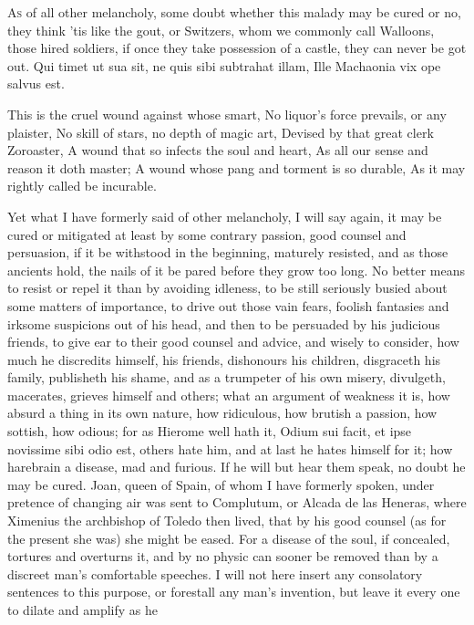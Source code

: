 {\lettrine{A}{s} of all other melancholy, some doubt whether this malady may be cured
or no, they think 'tis like the gout, or Switzers, whom we
commonly call Walloons, those hired soldiers, if once they take
possession of a castle, they can never be got out.
Qui timet ut sua sit, ne quis sibi subtrahat illam,
Ille Machaonia vix ope salvus est.

This is the cruel wound against whose smart,
No liquor's force prevails, or any plaister,
No skill of stars, no depth of magic art,
Devised by that great clerk Zoroaster,
A wound that so infects the soul and heart,
As all our sense and reason it doth master;
A wound whose pang and torment is so durable,
As it may rightly called be incurable.

Yet what I have formerly said of other melancholy, I will say again, it
may be cured or mitigated at least by some contrary passion, good
counsel and persuasion, if it be withstood in the beginning, maturely
resisted, and as those ancients hold, the nails of it be pared
before they grow too long. No better means to resist or repel it than
by avoiding idleness, to be still seriously busied about some matters
of importance, to drive out those vain fears, foolish fantasies and
irksome suspicions out of his head, and then to be persuaded by his
judicious friends, to give ear to their good counsel and advice, and
wisely to consider, how much he discredits himself, his friends,
dishonours his children, disgraceth his family, publisheth his shame,
and as a trumpeter of his own misery, divulgeth, macerates, grieves
himself and others; what an argument of weakness it is, how absurd a
thing in its own nature, how ridiculous, how brutish a passion, how
sottish, how odious; for as Hierome well hath it, Odium sui
facit, et ipse novissime sibi odio est, others hate him, and at last he
hates himself for it; how harebrain a disease, mad and furious. If he
will but hear them speak, no doubt he may be cured. Joan, queen
of Spain, of whom I have formerly spoken, under pretence of changing
air was sent to Complutum, or Alcada de las Heneras, where Ximenius the
archbishop of Toledo then lived, that by his good counsel (as for the
present she was) she might be eased. For a disease of the soul,
if concealed, tortures and overturns it, and by no physic can sooner be
removed than by a discreet man's comfortable speeches. I will not here
insert any consolatory sentences to this purpose, or forestall any
man's invention, but leave it every one to dilate and amplify as he
}
